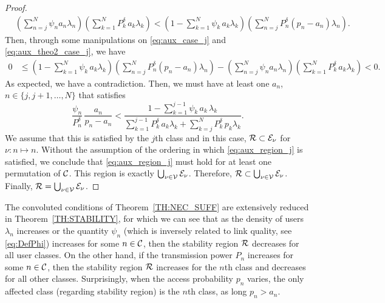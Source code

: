 \begin{proof}
    \begin{align} \label{eq:aux_theo2_case_j}
        &\left(\sum_{n=j}^N \psi_n a_n \lambda_n \right)
            \left(\sum_{k=1}^N P_k^\delta\,a_k \lambda_k \right) < \left(1 - \sum_{k=1}^N \psi_k\,a_k \lambda_k \right)\left(\sum_{n=j}^N P_n^\delta (p_n-a_n) \lambda_n\right).
    \end{align}
    Then, through some manipulations on \eqref{eq:aux_case_j} and \eqref{eq:aux_theo2_case_j}, we have
    \begin{align*}
        0 &\le \left(1 - \sum_{k=1}^N \psi_k\,a_k \lambda_k \right)\left(\sum_{n=j}^N P_n^\delta (p_n-a_n) \lambda_n\right) - \left(\sum_{n=j}^N \psi_n a_n \lambda_n \right)
            \left(\sum_{k=1}^N P_k^\delta\,a_k \lambda_k \right) < 0.
    \end{align*}
    As expected, we have a contradiction. Then, we must have at least one $a_n$, $n\in{\{j,j+1,\dots,N\}}$ that satisfies
    \begin{equation} \label{eq:aux_region_j}
    	\dfrac{\psi_n}{P_n^\delta}\,\dfrac{a_n}{p_n-a_n} <
        \dfrac{1-\sum_{k=1}^{j-1} \psi_k\,a_k\,\lambda_k}
        {\sum_{k=1}^{j-1} P_k^\delta\,a_k\lambda_k+
        \sum_{k=j}^N P_k^\delta\,p_k\lambda_k}.
    \end{equation}
    We assume that this is satisfied by the $j$th class and in this case, $\cal{R} \subset \cal{E}_\nu$ for $\nu: n \longmapsto n$.
    Without the assumption of the ordering in which \eqref{eq:aux_region_j} is satisfied, we conclude that \eqref{eq:aux_region_j} must hold for at least one permutation of $\cal{C}$. This region is exactly $\bigcup_{\nu\in\cal{V}} \cal{E}_\nu$. Therefore, ${\cal{R} \subset \bigcup_{\nu\in\cal{V}} \cal{E}_\nu}$.
    Finally, ${\cal{R} = \bigcup_{\nu\in\cal{V}} \cal{E}_\nu}$.
\end{proof}

\begin{remark}
        The convoluted conditions of Theorem~\ref{TH:NEC_SUFF} are extensively reduced in Theorem~\ref{TH:STABILITY}, for which we can see that as the density of users $\lambda_n$ increases or the quantity $\psi_n$ (which is inversely related to link quality, see \eqref{eq:DefPhi}) increases for some $n\in\cal{C}$, then the stability region $\cal{R}$ decreases for all user classes. On the other hand, if the transmission power $P_n$ increases for some $n\in\cal{C}$, then the stability region $\cal{R}$ increases for the $n$th class and decreases for all other classes. Surprisingly, when the access probability $p_n$ varies, the only affected class (regarding stability region) is the $n$th class, as long $p_n>a_n$.
\end{remark}

